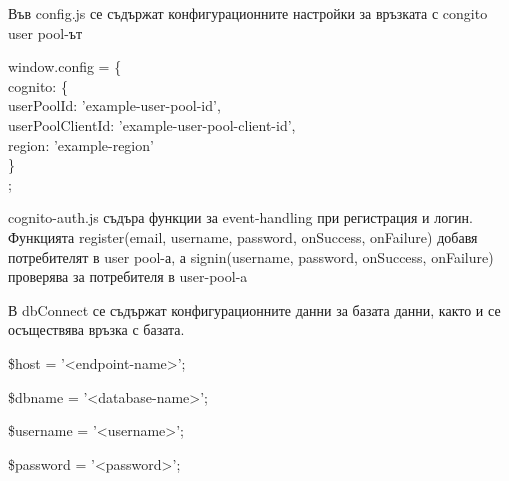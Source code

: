 \documentclass[12pt]{article}
\begin{document}
Във config.js се съдържат конфигурационните настройки за връзката с congito user  pool-ът

\medskip
\noindent window.\textunderscore config = \{ \\
    cognito: \{  \\
        userPoolId:  'example-user-pool-id', \\
        userPoolClientId: 'example-user-pool-client-id',\\ 
        region: 'example-region' \\
   \}\\ ;

\medskip
cognito-auth.js съдъра функции за event-handling при регистрация и логин. Функцията register(email, username, password, onSuccess, onFailure) добавя потребителят в user pool-а, а signin(username, password, onSuccess, onFailure)  проверява за потребителя в user-pool-a
 
  
 В dbConnect се съдържат конфигурационните данни за базата данни, както и се осъществява връзка с базата.
 
 \medskip
 \$host = '<endpoint-name>'; 

 \medskip
\$dbname = '<database-name>';

 \medskip
\$username = '<username>';

 \medskip
\$password = '<password>'; 
\end{document}
